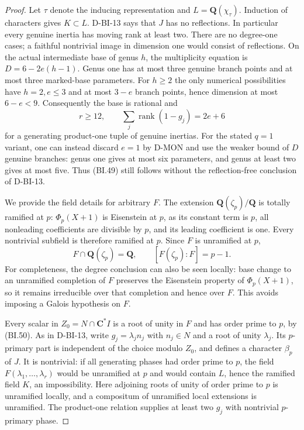 \begin{proof}
Let $\tau$ denote the inducing representation and
$L=\mathbf Q(\chi_\tau)$.  Induction of characters gives
$K\subset L$.  D-BI-13 says that $J$ has no reflections.
In particular every genuine inertia has moving rank at least two.
There are no degree-one cases; a faithful nontrivial image in
dimension one would consist of reflections.  On the actual
intermediate base of genus $h$, the multiplicity equation is
$D=6-2e(h-1)$.  Genus one has at most three genuine branch points
and at most three marked-base parameters.  For $h\ge2$ the
only numerical possibilities have $h=2,e\le3$ and at most
$3-e$ branch points, hence dimension at most $6-e<9$.
Consequently the base is rational and
\[
 r\ge12,\qquad \sum_j\operatorname{rank}(1-g_j)=2e+6
                                                               \tag{BI.49}
\]
for a generating product-one tuple of genuine inertias.
For the stated $q=1$ variant, one can instead discard $e=1$
by D-MON and use the weaker bound of $D$ genuine branches:
genus one gives at most six parameters, and genus at least two
gives at most five.  Thus (BI.49) still follows without the
reflection-free conclusion of D-BI-13.

We provide the field details for arbitrary $F$.  The extension
$\mathbf Q(\zeta_p)/\mathbf Q$ is totally ramified at $p$:
$\Phi_p(X+1)$ is Eisenstein at $p$, as its constant term is
$p$, all nonleading coefficients are divisible by $p$, and its
leading coefficient is one.  Every nontrivial subfield is therefore
ramified at $p$.  Since $F$ is unramified at $p$,
\[
              F\cap\mathbf Q(\zeta_p)=\mathbf Q,
              \qquad [F(\zeta_p):F]=p-1.                  \tag{BI.50}
\]
For completeness, the degree conclusion can also be seen locally:
base change to an unramified completion of $F$ preserves the
Eisenstein property of $\Phi_p(X+1)$, so it remains irreducible
over that completion and hence over $F$.
This avoids imposing a Galois hypothesis on $F$.

Every scalar in $Z_0=N\cap\mathbf C^*I$ is a root of unity in
$F$ and has order prime to $p$, by (BI.50).  As in D-BI-13,
write $g_j=\lambda_j n_j$ with $n_j\in N$ and a root of unity
$\lambda_j$.  Its $p$-primary part is independent of the choice
modulo $Z_0$, and defines a character $\beta_p$ of $J$.
It is nontrivial: if all generating phases had order prime to
$p$, the field $F(\lambda_1,\ldots,\lambda_r)$ would be
unramified at $p$ and would contain $L$, hence the ramified field
$K$, an impossibility.  Here adjoining roots of unity of order
prime to $p$ is unramified locally, and a compositum of unramified
local extensions is unramified.  The product-one relation supplies
at least two $g_j$ with nontrivial $p$-primary phase.


\end{proof}
